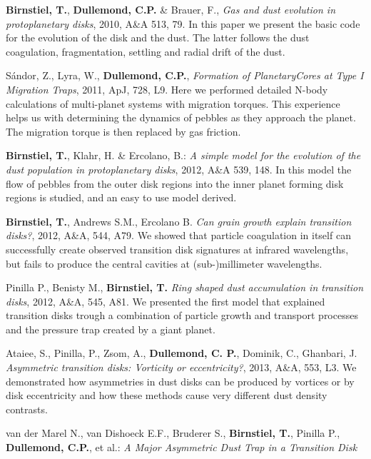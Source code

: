 \documentclass[10pt,fleqn,twoside]{article}
\newenvironment{literature}%
 {\begin{multicols}{2}\begin{scriptsize}\begin{list}{}{%
   \setlength{\topsep}{0em}%
   \setlength{\parskip}{0em}%
   \setlength{\parsep}{0em}%
   \setlength{\itemsep}{0em}%
   \setlength{\rightmargin}{0em}%
   \setlength{\leftmargin}{2em}%
   \setlength{\itemindent}{-2em}}}%
 {\end{list}\end{scriptsize}\end{multicols}}
\begin{document}
\begin{literature}
\item \textbf{Birnstiel, T.}, \textbf{Dullemond, C.P.} \& Brauer, F.,
  \textit{Gas and dust evolution in protoplanetary disks}, 2010, A\&A
  513, 79. In this paper we present the basic code for the evolution
  of the disk and the dust.
  The latter follows the dust coagulation, fragmentation, settling and
  radial drift of the dust.
\item S\'andor, Z., Lyra, W., \textbf{Dullemond, C.P.}, {\em Formation
  of PlanetaryCores at Type I Migration Traps}, 2011, ApJ, 728, L9.
  Here we performed detailed N-body calculations of multi-planet
  systems with migration torques. This experience helps us with
  determining the dynamics of pebbles as they approach the planet. The
  migration torque is then replaced by gas friction.
\item \textbf{Birnstiel, T.}, Klahr, H. \& Ercolano, B.: \textit{A
  simple model for the evolution of the dust population in
  protoplanetary disks}, 2012, A\&A 539, 148. In this model the flow
  of pebbles from the outer disk regions into the inner planet forming
  disk regions is studied, and an easy to use model derived.
\item \textbf{Birnstiel, T.}, Andrews S.M., Ercolano B. \textit{Can
  grain growth explain transition disks?}, 2012, A\&A, 544, A79. We
  showed that particle coagulation in itself can successfully create
  observed transition disk signatures at infrared wavelengths, but
  fails to produce the central cavities at (sub-)millimeter
  wavelengths.
\item Pinilla P., Benisty M., \textbf{Birnstiel, T.} \textit{Ring
  shaped dust accumulation in transition disks}, 2012, A\&A, 545, A81.
  We presented the first model that explained transition disks trough
  a combination of particle growth and transport processes and the
  pressure trap created by a giant planet.
\item Ataiee, S., Pinilla, P., Zsom, A., \textbf{Dullemond, C. P.},
  Dominik, C., Ghanbari, J. \textit{Asymmetric transition disks:
  Vorticity or eccentricity?}, 2013, A\&A, 553, L3. We demonstrated
  how asymmetries in dust disks can be produced by vortices or by disk
  eccentricity and how these methods cause very different dust density
  contrasts. 
\item van der Marel N., van Dishoeck E.F., Bruderer S.,
  \textbf{Birnstiel, T.}, Pinilla P., \textbf{Dullemond, C.P.}, et
  al.: \textit{A Major Asymmetric Dust Trap in a Transition Disk}

\end{literature}
\end{document}

